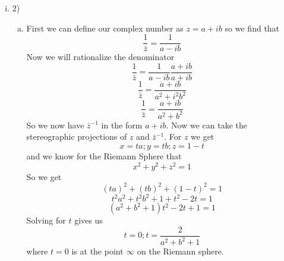 \documentclass[11pt]{article}
\begin{document}
\begin{enumerate}
\begin{enumerate}[(i)]
\item 2)
	\begin{enumerate}[(a)]
	\item
First we can define our complex number as $z = a + ib$ so we find that
$$\frac{1}{\bar{z}} = \frac{1}{a - ib}$$
Now we will rationalize the denominator
$$\frac{1}{\bar{z}} = \frac{1}{a - ib}\frac{a + ib}{a + ib}$$
$$\frac{1}{\bar{z}} = \frac{a + ib}{a^2 + i^2b^2}$$
$$\frac{1}{\bar{z}} = \frac{a + ib}{a^2 + b^2}$$
So we now have $\bar{z}^{-1}$ in the form $a + ib$. Now we can take the stereographic projections of $z$ and $\bar{z}^{-1}$. For $z$ we get
$$x=ta; y=tb; z=1-t$$
and we know for the Riemann Sphere that
$$x^2 + y^2 + z^2 = 1$$
So we get
$$(ta)^2 + (tb)^2 + (1-t)^2 = 1$$
$$t^2a^2 + t^2b^2 + 1 + t^2 -2t = 1$$
$$(a^2 + b^2 + 1)t^2 -2t +1 = 1$$
Solving for $t$ gives us
$$t = 0; t = \frac{2}{a^2+b^2+1}$$
where $t=0$ is at the point $\infty$ on the Riemann sphere.


\end{enumerate}
\end{enumerate}
\end{enumerate}
\end{document}
